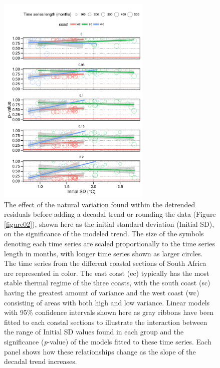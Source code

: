 \documentclass[]{ametsoc}
\begin{document}
\begin{figure}
\centering \includegraphics[width=0.65\textwidth]{figure05}
\caption[\small The effect of the natural variation found within the detrended residuals on the significance]{The effect of the natural variation found within the detrended residuals before adding a decadal trend or rounding the data (Figure \ref{figure02}), shown here as the initial standard deviation (Initial SD), on the significance of the modeled trend. The size of the symbols denoting each time series are scaled proportionally to the time series length in months, with longer time series shown as larger circles. The time series from the different coastal sections of South Africa are represented in color. The east coast (ec) typically has the most stable thermal regime of the three coasts, with the south coast (sc) having the greatest amount of variance and the west coast (wc) consisting of areas with both high and low variance. Linear models with 95\% confidence intervals shown here as gray ribbons have been fitted to each coastal sections to illustrate the interaction between the range of Initial SD values found in each group and the significance (\emph{p}-value) of the models fitted to these time series. Each panel shows how these relationships change as the slope of the decadal trend increases.}
\label{figure05}
\end{figure}
\end{document}
